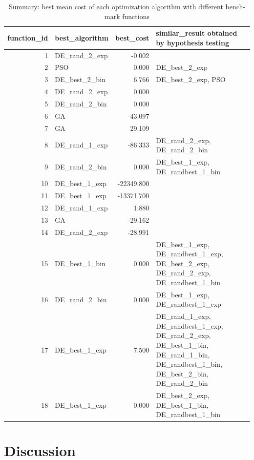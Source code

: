 \documentclass[12pt]{article}
\begin{document}
\begin{table}[H]
    \centering
    \footnotesize 
\begin{tabular}{rlrp{}}
\toprule
 function\_id & best\_algorithm &  best\_cost &                                                                                                                  similar\_result obtained by hypothesis testing \\
\midrule
 1 &  DE\_rand\_2\_exp & -0.002 &   \\
 2 &  PSO & 0.000 &  DE\_best\_2\_exp \\
 3 &  DE\_best\_2\_bin & 6.766 &  DE\_best\_2\_exp, PSO \\
 4 &  DE\_rand\_2\_exp & 0.000 &   \\
 5 &  DE\_rand\_2\_bin & 0.000 &   \\
 6 &  GA & -43.097 &   \\
 7 &  GA & 29.109 &   \\
 8 &  DE\_rand\_1\_exp & -86.333 &  DE\_rand\_2\_exp, DE\_rand\_2\_bin \\
 9 &  DE\_rand\_2\_bin & 0.000 &  DE\_best\_1\_exp, DE\_randbest\_1\_bin \\
 10 &  DE\_best\_1\_exp & -22349.800 &   \\
 11 &  DE\_best\_1\_exp & -13371.700 &   \\
 12 &  DE\_rand\_1\_exp & 1.880 &   \\
 13 &  GA & -29.162 &   \\
 14 &  DE\_rand\_2\_exp & -28.991 &   \\
 15 &  DE\_best\_1\_bin & 0.000 &  DE\_best\_1\_exp, DE\_randbest\_1\_exp, DE\_best\_2\_exp, DE\_rand\_2\_exp, DE\_randbest\_1\_bin \\
 16 &  DE\_rand\_2\_bin & 0.000 &  DE\_best\_1\_exp, DE\_randbest\_1\_exp \\
 17 &  DE\_best\_1\_exp & 7.500 &  DE\_rand\_1\_exp, DE\_randbest\_1\_exp, DE\_rand\_2\_exp, DE\_best\_1\_bin, DE\_rand\_1\_bin, DE\_randbest\_1\_bin, DE\_best\_2\_bin, DE\_rand\_2\_bin \\
 18 &  DE\_best\_1\_exp & 0.000 &  DE\_best\_2\_exp, DE\_best\_1\_bin, DE\_randbest\_1\_bin \\
\bottomrule
\end{tabular}
\caption{Summary: best mean cost of each optimization algorithm with different bench-mark functions} 
    \label{tab:summary_best}
\end{table}


\section{Discussion}
\end{document}

